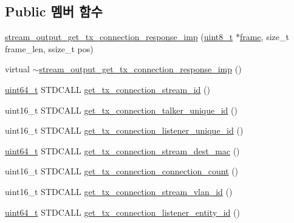 \subsection*{Public 멤버 함수}
\begin{DoxyCompactItemize}
\item 
\hyperlink{classavdecc__lib_1_1stream__output__get__tx__connection__response__imp_a284609102fcf7710488a5770968c93e8}{stream\+\_\+output\+\_\+get\+\_\+tx\+\_\+connection\+\_\+response\+\_\+imp} (\hyperlink{stdint_8h_aba7bc1797add20fe3efdf37ced1182c5}{uint8\+\_\+t} $\ast$\hyperlink{gst__avb__playbin_8c_ac8e710e0b5e994c0545d75d69868c6f0}{frame}, size\+\_\+t frame\+\_\+len, ssize\+\_\+t pos)
\item 
virtual \hyperlink{classavdecc__lib_1_1stream__output__get__tx__connection__response__imp_a5d2bc0df10aa14b592337b7837e2ed8f}{$\sim$stream\+\_\+output\+\_\+get\+\_\+tx\+\_\+connection\+\_\+response\+\_\+imp} ()
\item 
\hyperlink{parse_8c_aec6fcb673ff035718c238c8c9d544c47}{uint64\+\_\+t} S\+T\+D\+C\+A\+LL \hyperlink{classavdecc__lib_1_1stream__output__get__tx__connection__response__imp_a75bcc3c5ff68a87805a82bcd9ee5b4da}{get\+\_\+tx\+\_\+connection\+\_\+stream\+\_\+id} ()
\item 
uint16\+\_\+t S\+T\+D\+C\+A\+LL \hyperlink{classavdecc__lib_1_1stream__output__get__tx__connection__response__imp_a6f9091b586d69ed47cf79fb7bd91994b}{get\+\_\+tx\+\_\+connection\+\_\+talker\+\_\+unique\+\_\+id} ()
\item 
uint16\+\_\+t S\+T\+D\+C\+A\+LL \hyperlink{classavdecc__lib_1_1stream__output__get__tx__connection__response__imp_a5f1b3ceffcc6d3995d774b1a2278d54c}{get\+\_\+tx\+\_\+connection\+\_\+listener\+\_\+unique\+\_\+id} ()
\item 
\hyperlink{parse_8c_aec6fcb673ff035718c238c8c9d544c47}{uint64\+\_\+t} S\+T\+D\+C\+A\+LL \hyperlink{classavdecc__lib_1_1stream__output__get__tx__connection__response__imp_ac7aeb545dd0c489176eb3ef02292da40}{get\+\_\+tx\+\_\+connection\+\_\+stream\+\_\+dest\+\_\+mac} ()
\item 
uint16\+\_\+t S\+T\+D\+C\+A\+LL \hyperlink{classavdecc__lib_1_1stream__output__get__tx__connection__response__imp_aa0c551dd141b8d0c93933a13fd51df4c}{get\+\_\+tx\+\_\+connection\+\_\+connection\+\_\+count} ()
\item 
uint16\+\_\+t S\+T\+D\+C\+A\+LL \hyperlink{classavdecc__lib_1_1stream__output__get__tx__connection__response__imp_a3a39e80bec6a5f8cf6875626813b176a}{get\+\_\+tx\+\_\+connection\+\_\+stream\+\_\+vlan\+\_\+id} ()
\item 
\hyperlink{parse_8c_aec6fcb673ff035718c238c8c9d544c47}{uint64\+\_\+t} S\+T\+D\+C\+A\+LL \hyperlink{classavdecc__lib_1_1stream__output__get__tx__connection__response__imp_ac06726850dc2eff1a1f381618e145901}{get\+\_\+tx\+\_\+connection\+\_\+listener\+\_\+entity\+\_\+id} ()
\end{DoxyCompactItemize}
